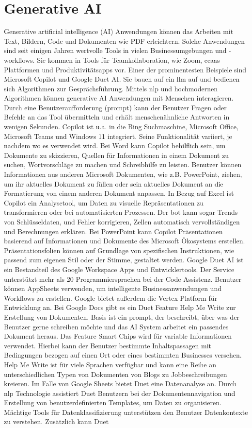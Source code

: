 \section{Generative AI}
Generative artificial intelligence (AI) Anwendungen können das Arbeiten mit Text, Bildern, Code und Dokumenten wie PDF erleichtern. Solche Anwendungen sind seit einigen Jahren wertvolle Tools in vielen Businessumgebungen und -workflows. Sie kommen in Tools für Teamkollaboration, wie Zoom, \gls{ccaas} Plattformen und Produktivitätsapps vor. Einer der prominentesten Beispiele sind Microsoft Copilot und Google Duet AI. Sie bauen auf ein \gls{llm} auf und bedienen sich Algorithmen zur Gesprächsführung. Mittels \gls{nlp} und hochmodernen Algorithmen können generative AI Anwendungen mit Menschen interagieren. Durch eine Benutzeraufforderung (prompt) kann der Benutzer Fragen oder Befehle an das Tool übermitteln und erhält menschenähnliche Antworten in wenigen Sekunden. Copilot ist u.a. in die Bing Suchmaschine, Microsoft Office, Microsoft Teams und Windows 11 integriert. Seine Funktionalität variiert, je nachdem wo es verwendet wird. Bei Word kann Copilot behilflich sein, um Dokumente zu skizzieren, Quellen für Informationen in einem Dokument zu suchen, Wortvorschläge zu machen und Schreibhilfe zu leisten. Benutzer können Informationen aus anderen Microsoft Dokumenten, wie z.B. PowerPoint, ziehen, um ihr aktuelles Dokument zu füllen oder sein aktuelles Dokument an die Formatierung von einem anderen Dokument anpassen. In Bezug auf Excel ist Copilot ein Analysetool, um Daten zu visuelle Repräsentationen zu transformieren oder bei automatisierten Prozessen. Der bot kann sogar Trends von Schlüsseldaten, und Fehler korrigieren, Zellen automatisch vervollständigen und Berechnungen erklären. Bei PowerPoint kann Copilot Präsentationen basierend auf Informationen und Dokumente des Microsoft Ökosystems erstellen. Präsentationsfolien können auf Grundlage von spezifischen Instruktionen, wie passend zum eigenen Stil oder der Stimme, gestaltet werden. Google Duet AI ist ein Bestandteil des Google Workspace Apps und Entwicklertools. Der Service unterstützt mehr als 20 Programmiersprachen bei der Code Assistenz. Benutzer können AppSheets verwenden, um intelligente Businessanwendungen und Workflows zu erstellen. Google bietet außerdem die Vertex Platform für Entwicklung an. Bei Google Docs gibt es ein Duet Feature Help Me Write zur Erstellung von Dokumenten. Basis ist ein prompt, der beschreibt, über was der Benutzer gerne schreiben möchte und das AI System arbeitet ein passendes Dokument heraus. Das Feature Smart Chips wird für variable Informationen verwendet. Hierbei kann der Benutzer bestimmte Inhaltspassagen mit Bedingungen bezogen auf einen Ort oder eines bestimmten Businesses versehen. Help Me Write ist für viele Sprachen verfügbar und kann eine Reihe an unterschiedlichen Typen von Dokumenten von Blogs zu Jobbeschreibungen kreieren. Im Falle von Google Sheets bietet Duet eine Datenanalyse an. Durch \gls{nlp} Technologie assistiert Duet Benutzern bei der Dokumentennavigation und Erstellung von benutzerdefinierten Templates, um Daten zu organisieren. Mächtige Tools für Datenklassifizierung unterstützen den Benutzer Datenkontexte zu verstehen. Zusätzlich kann Duet 